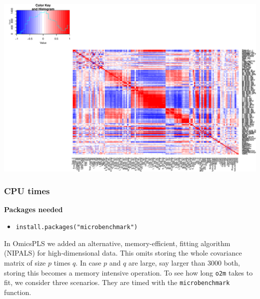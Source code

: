 \documentclass[]{article}
\providecommand{\tightlist}{%
  \setlength{\itemsep}{0pt}\setlength{\parskip}{0pt}}
\begin{document}
\includegraphics{Figs/Heatmap decomposition-3.pdf}

\subsubsection{CPU times}\label{cpu-times}

\textbf{Packages needed}

\begin{itemize}
\tightlist
\item
  \texttt{install.packages("microbenchmark")}
\end{itemize}

In OmicsPLS we added an alternative, memory-efficient, fitting algorithm
(NIPALS) for high-dimensional data. This omits storing the whole
covariance matrix of size \(p\) times \(q\). In case \(p\) and \(q\) are
large, say larger than 3000 both, storing this becomes a memory
intensive operation. To see how long \texttt{o2m} takes to fit, we
consider three scenarios. They are timed with the
\texttt{microbenchmark} function.
\end{document}
